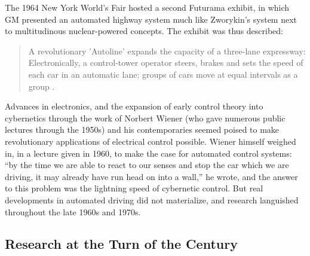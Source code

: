 The 1964 New York World's Fair hosted a second Futurama exhibit, in
which GM presented an automated highway system much like Zworykin's
system next to multitudinous nuclear-powered concepts. The exhibit was
thus described: 
\begin{quote}
A revolutionary 'Autoline' expands the capacity of a three-lane
expressway: Electronically, a control-tower operator steers, brakes
and sets the speed of each car in an automatic lane; groups of cars
move at equal intervals as a group \cite{???}.
\end{quote}
 Advances in
electronics, and the expansion of early control theory into
cybernetics through the work of Norbert Wiener (who gave numerous
public lectures through the 1950s) and his contemporaries seemed
poised to make revolutionary applications of electrical control
possible. Wiener himself weighed in, in a lecture given in 1960, to
make the case for automated control systems: ``by the time we are able
to react to our senses and stop the car which we are driving, it may
already have run head on into a wall,'' he wrote, and the answer to
this problem was the lightning speed of cybernetic control.\cite{???} But real
developments in automated driving did not materialize, and research
languished throughout the late 1960s and 1970s.\cite{???}

\subsection{Research at the Turn of the Century}


